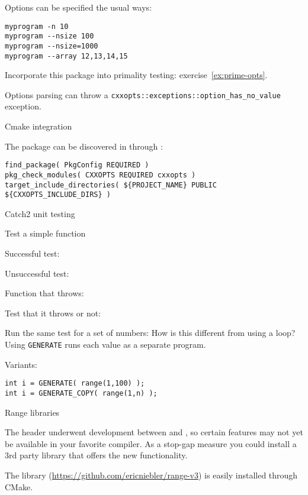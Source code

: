 Options can be specified the usual ways:
\begin{verbatim}
myprogram -n 10
myprogram --nsize 100
myprogram --nsize=1000
myprogram --array 12,13,14,15
\end{verbatim}

\begin{exercise}
  Incorporate this package into primality testing:
  exercise~\ref{ex:prime-opts}.
\end{exercise}

Options parsing can throw a
\lstinline{cxxopts::exceptions::option_has_no_value}
exception.

 {Cmake integration}

The  package can be discovered in 
through :
\begingroup\lstset{language=Bash}
\begin{lstlisting}
find_package( PkgConfig REQUIRED )
pkg_check_modules( CXXOPTS REQUIRED cxxopts )
target_include_directories( ${PROJECT_NAME} PUBLIC ${CXXOPTS_INCLUDE_DIRS} )
\end{lstlisting}
\endgroup



 {Catch2 unit testing}
\label{sec:catch2}

Test a simple function

Successful test:

Unsuccessful test:

Function that throws:

Test that it throws or not:

Run the same test for a set of numbers:
How is this different from using a loop?
Using \lstinline{GENERATE} runs each value as a separate program.

Variants:
\begin{lstlisting}
int i = GENERATE( range(1,100) );
int i = GENERATE_COPY( range(1,n) );
\end{lstlisting}


 {Range libraries}

The  header underwent development
between  and ,
so certain features may not yet be available
in your favorite compiler.
As a stop-gap measure you could install a 3rd party library
that offers the new functionality.

The  library
(\url{https://github.com/ericniebler/range-v3})
is easily installed through CMake.
